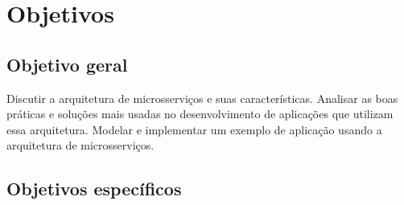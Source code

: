 


\section{Objetivos}\label{sec-objetivos}


\subsection{Objetivo geral}\label{sec-objetivo-geral}

Discutir a arquitetura de microsserviços e suas características. Analisar as boas práticas e soluções mais usadas no desenvolvimento de aplicações que utilizam essa arquitetura. Modelar e implementar um exemplo de aplicação usando a arquitetura de microsserviços.

\subsection{Objetivos específicos}\label{sec-objetivos-especificos}

